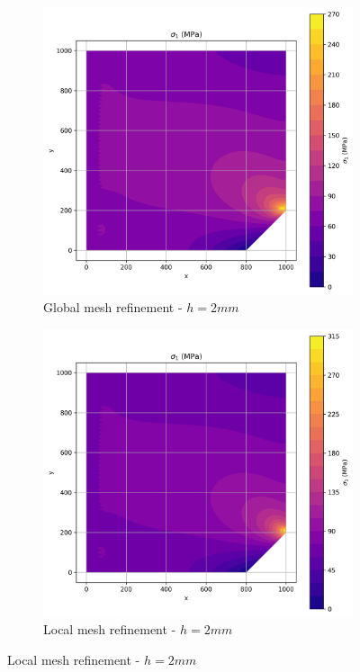 \begin{figure}[H]
  \centering
  \begin{subfigure}[b]{0.45\textwidth}
    \centering
    \includegraphics[width=\textwidth]{GRAFICOS/Quad9/2mm_global/resultados - sigma_1.png}
    \caption{Global mesh refinement - $h=2mm$}
    \label{fig:img1}
  \end{subfigure}
  \hfill
  \begin{subfigure}[b]{0.45\textwidth}
    \centering
    \includegraphics[width=\textwidth]{GRAFICOS/Quad9/2mm_local/resultados - sigma_1.png}
    \caption{Local mesh refinement - $h=2mm$}
    \label{fig:img2}
  \end{subfigure}
\end{figure}

